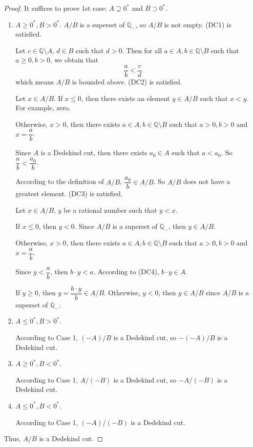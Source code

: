 \begin{proof}
    It suffices to prove 1st case: $A\supseteq {0}^{*}$ and $B\supset {0}^{*}$.

    \begin{enumerate}[label={\textbf{Case \arabic*.}},itemindent=0.4cm]
        \item $A\ge {0}^{*}, B > {0}^{*}$.
              $A/B$ is a superset of $\mathbb{Q}_{-}$, so $A/B$ is not empty. (DC1) is satisfied.
              \bigskip

              Let $c\in\mathbb{Q}\setminus A$, $d\in B$ such that $d > 0$. Then for all $a\in A, b\in\mathbb{Q}\setminus B$ such that $a \ge 0, b > 0$, we obtain that
              \[
                  \frac{a}{b} < \frac{c}{d}
              \]
              which means $A/B$ is bounded above. (DC2) is satisfied.
              \bigskip

              Let $x\in A/B$. If $x\le 0$, then there exists an element $y\in A/B$ such that $x < y$. For example, zero.

              Otherwise, $x > 0$, then there exists $a\in A, b\in\mathbb{Q}\setminus B$ such that $a > 0, b > 0$ and $x = \dfrac{a}{b}$.

              Since $A$ is a Dedekind cut, then there exists $a_{0}\in A$ such that $a < a_{0}$. So $\dfrac{a}{b} < \dfrac{a_{0}}{b}$.

              According to the definition of $A/B$, $\dfrac{a_{0}}{b}\in A/B$. So $A/B$ does not have a greatest element. (DC3) is satisfied.
              \bigskip

              Let $x\in A/B$, $y$ be a rational number such that $y < x$.

              If $x\le 0$, then $y < 0$. Since $A/B$ is a superset of $\mathbb{Q}_{-}$, then $y\in A/B$.

              Otherwise, $x > 0$, then there exists $a\in A, b\in\mathbb{Q}\setminus B$ such that $a > 0, b > 0$ and $x = \dfrac{a}{b}$.

              Since $y < \dfrac{a}{b}$, then $b\cdot y < a$. According to (DC4), $b\cdot y\in A$.

              If $y\ge 0$, then $y = \dfrac{b\cdot y}{b} \in A/B$. Otherwise, $y < 0$, then $y\in A/B$ since $A/B$ is a superset of $\mathbb{Q}_{-}$.
        \item $A\le {0}^{*}, B > {0}^{*}$.

              According to Case 1, $(-A)/B$ is a Dedekind cut, so $-(-A)/B$ is a Dedekind cut.
        \item $A\ge {0}^{*}, B < {0}^{*}$.

              According to Case 1, $A/(-B)$ is a Dedekind cut, so $-A/(-B)$ is a Dedekind cut.
        \item $A\le {0}^{*}, B < {0}^{*}$.

              According to Case 1, $(-A)/(-B)$ is a Dedekind cut.
    \end{enumerate}

    Thus, $A/B$ is a Dedekind cut.
\end{proof}

